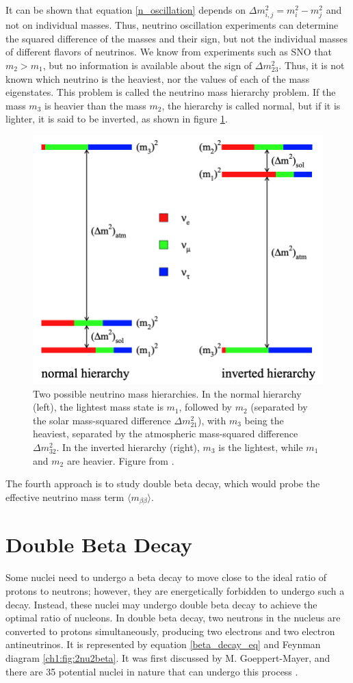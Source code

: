 It can be shown that equation \ref{n_oscillation} depends on $\Delta m^2_{i,j}=m^2_i-m^2_j$ and not on individual masses. Thus, neutrino oscillation experiments can determine the squared difference of the masses and their sign, but not the individual masses of different flavors of neutrinos. We know from experiments such as SNO that $m_2>m_1$, but no information is available about the sign of $\Delta m_{23}^2$. Thus, it is not known which neutrino is the heaviest, nor the values of each of the mass eigenstates. This problem is called the neutrino mass hierarchy problem. If the mass $m_3$ is heavier than the mass $m_2$, the hierarchy is called normal, but if it is lighter, it is said to be inverted, as shown in figure \ref{mass_hierarchies_fig}.

\begin{figure}[!htb]
\centering
\includegraphics[width=0.75\linewidth]{ch1/figs/mass_hierarchies.png}
\caption{Two possible neutrino mass hierarchies. In the normal hierarchy (left), the lightest mass state is \( m_1 \), followed by \( m_2 \) (separated by the solar mass-squared difference \( \Delta m^2_{21} \)), with \( m_3 \) being the heaviest, separated by the atmospheric mass-squared difference \( \Delta m^2_{32} \). In the inverted hierarchy (right), \( m_3 \) is the lightest, while \( m_1 \) and \( m_2 \) are heavier. Figure from \cite{Hewett:2012ns}.}
\label{mass_hierarchies_fig}
\end{figure}

The fourth approach is to study double beta decay, which would probe the effective neutrino mass term $\langle m_{\beta\beta}\rangle$.

\section{Double Beta Decay}
Some nuclei need to undergo a beta decay to move close to the ideal ratio of protons to neutrons; however, they are energetically forbidden to undergo such a decay. Instead, these nuclei may undergo double beta decay to achieve the optimal ratio of nucleons. In double beta decay, two neutrons in the nucleus are converted to protons simultaneously, producing two electrons and two electron antineutrinos. It is represented by equation \ref{beta_decay_eq} and Feynman diagram \ref{ch1:fig:2nu2beta}. It was first discussed by M. Goeppert-Mayer, and there are 35 potential nuclei in nature that can undergo this process \cite{ZUBER_2012}.

